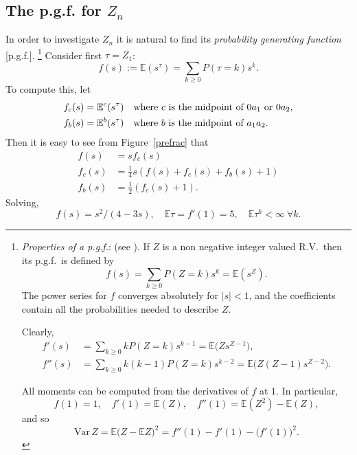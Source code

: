 \documentclass[a4paper]{amsart}
\theoremstyle{plain}
\theoremstyle{definition}
\theoremstyle{remark}
\begin{document}
\subsection{The p.g.f. for $ Z_n $}
 In order to investigate $ Z_n $ it is natural to find its \emph{probability generating function} [p.g.f.].%
\footnote{\emph{Properties of a  p.g.f.}: (see \cite{Lal}).  If $ Z$ is a non negative integer valued R.V.\ then its p.g.f.\ is defined by
\[  f(s) = \sum_{k\geq 0}  P(Z=k)s^k = \mathbb{E} (s^ Z).\]
The power series for $ f $ converges absolutely for $ |s | < 1 $, and the coefficients contain all the probabilities needed to describe $ Z$.

Clearly,
\begin{align*}
f'(s) &= \sum_{k\geq 0}  kP(Z=k)s^{k-1} = \mathbb{E} \big( Zs^{ Z -1} \big),\\
f''(s) &= \sum_{k\geq 0}  k(k-1)P(Z=k)s^{k-2} = \mathbb{E} \big(Z(Z-1)s^{ Z-2} \big).
\end{align*}


All moments can be computed from the derivatives of $ f  $ at $ 1 $.  In particular,
\[
f(1) = 1, \quad f'(1) = \mathbb{E} (Z ) , \quad f''(1) = \mathbb{E} (Z ^2) - \mathbb{E} ( Z ),
\]
and so 
\[
 \text{Var}\, Z = \mathbb{E} \big( Z - \mathbb{E}   Z \big)^2 
     = f''(1) - f'(1) - \big(f'(1)\big)^2.
     \]
}
Consider first  $ \tau =Z_1$:
\begin{equation} \label{} 
f(s) := \mathbb{E} (s^\tau) = \sum_{k\geq 0} P(\tau = k) s^k .
\end{equation} 
To compute this, let  
\begin{align*}
f_c(s) &= \mathbb{E} ^c(s^\tau) \quad \text{where $ c $ is the midpoint of $ 0a_1 $ or $ 0a_2 $},\\
f_b(s) &= \mathbb{E} ^b (s^\tau) \quad \text{where $ b $ is the midpoint of $  a_1 a_2 $}.
\end{align*}
Then it is easy to see from Figure~\ref{prefrac} that 
\begin{align*}
f(s) &= s f_c(s) \\
f_c(s) &= \frac{1}{4} s (f(s) + f_c(s) + f_b(s) + 1)\\
f_b(s) &= \frac{1}{2} (f_c(s) + 1).
\end{align*} 
Solving,
\begin{equation} \label{pgf1} 
f(s) = s^2/(4-3s), \quad \mathbb{E} \tau = f'(1) = 5, \quad \mathbb{E} \tau^k < \infty \ \forall k. 
\end{equation} 
\end{document}

